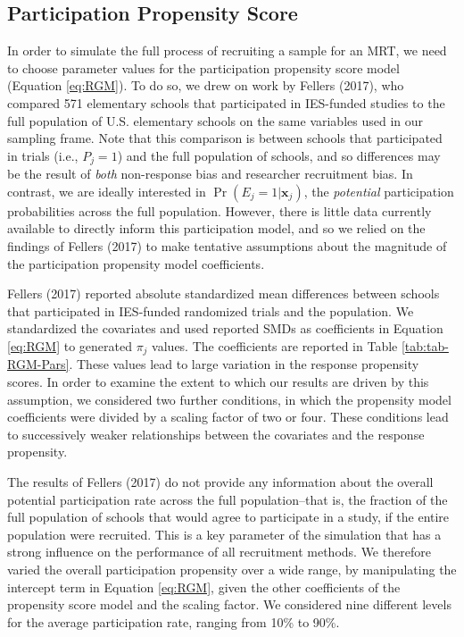 \documentclass[
  english,
  man,floatsintext]{apa6}
\begin{document}
\hypertarget{participation-propensity-score}{%
\subsection{Participation Propensity Score}\label{participation-propensity-score}}

In order to simulate the full process of recruiting a sample for an MRT, we need to choose parameter values for the participation propensity score model (Equation \eqref{eq:RGM}).
To do so, we drew on work by Fellers (2017), who compared 571 elementary schools that participated in IES-funded studies to the full population of U.S. elementary schools on the same variables used in our sampling frame.
Note that this comparison is between schools that participated in trials (i.e., \(P_j = 1\)) and the full population of schools, and so differences may be the result of \emph{both} non-response bias and researcher recruitment bias.
In contrast, we are ideally interested in \(\Pr(E_j = 1 | \mathbf{x}_j)\), the \emph{potential} participation probabilities across the full population.
However, there is little data currently available to directly inform this participation model, and so we relied on the findings of Fellers (2017) to make tentative assumptions about the magnitude of the participation propensity model coefficients.

Fellers (2017) reported absolute standardized mean differences between schools that participated in IES-funded randomized trials and the population. We standardized the covariates and used reported SMDs as coefficients in Equation \eqref{eq:RGM} to generated \(\pi_j\) values. The coefficients are reported in Table \ref{tab:tab-RGM-Pars}.
These values lead to large variation in the response propensity scores. In order to examine the extent to which our results are driven by this assumption, we considered two further conditions, in which the propensity model coefficients were divided by a scaling factor of two or four.
These conditions lead to successively weaker relationships between the covariates and the response propensity.

The results of Fellers (2017) do not provide any information about the overall potential participation rate across the full population--that is, the fraction of the full population of schools that would agree to participate in a study, if the entire population were recruited. This is a key parameter of the simulation that has a strong influence on the performance of all recruitment methods. We therefore varied the overall participation propensity over a wide range, by manipulating the intercept term in Equation \eqref{eq:RGM}, given the other coefficients of the propensity score model and the scaling factor. We considered nine different levels for the average participation rate, ranging from 10\% to 90\%.
\end{document}
